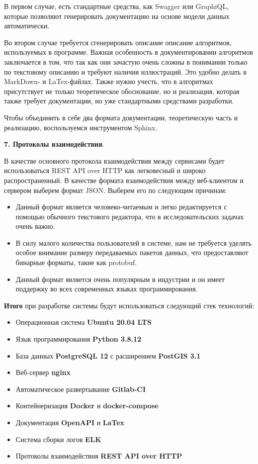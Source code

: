 В первом случае, есть стандартные средства, как Swagger или GraphiQL,
которые позволяют генерировать документацию на основе модели данных автоматически.

Во втором случае требуется сгенерировать описание описание алгоритмов, используемых в программе.
Важная особенность в документировании алгоритмов заключается в том, что так как они зачастую очень сложны
в понимании только по текстовому описанию и требуют наличия иллюстраций. Это удобно делать в MarkDown- и LaTex-файлах.
Также нужно учесть, что в алгоритмах присутствует не только теоретическое обоснование, но и реализация, которая также
требует документации, но уже стандартными средствами разработки.

Чтобы объединить в себе два формата документации, теоретическую часть и реализацию,
воспользуемся инструментом Sphinx\cite{Sphinx}.

\noindent \textbf{7. Протоколы взаимодействия}.

В качестве основного протокола взаимодействия между сервисами будет использоваться
REST API over HTTP как легковесный и широко распространенный.
В качестве формата взаимодействия между веб-клиентом и сервером выберем формат JSON. Выберем его по следующим причинам:
\begin{itemize}
    \item Данный формат является человеко-читаемым и легко редактируется с помощью обычного текстового редактора,
    что в исследовательских задачах очень важно.
    \item В силу малого количества пользователей в системе, нам не требуется уделять особое внимание размеру
    передаваемых пакетов данных, что предоставляют бинарные форматы, такие как protobuf\cite{Protobuf}.
    \item Данный формат является очень популярным в индустрии и он имеет поддержку
    во всех современных языках программирования.
\end{itemize}


\noindent \textbf{Итого} при разработке системы будут использоваться следующий стек технологий:
\begin{itemize}
    \item Операционная система \textbf{Ubuntu 20.04 LTS}
    \item Язык программирования \textbf{Python 3.8.12}
    \item База данных \textbf{PostgreSQL 12} с расширением \textbf{PostGIS 3.1}
    \item Веб-сервер \textbf{nginx}
    \item Автоматическое развертывание \textbf{Gitlab-CI}
    \item Контейнеризация \textbf{Docker} и \textbf{docker-compose}
    \item Документация \textbf{OpenAPI} и \textbf{LaTex}
    \item Система сборки логов \textbf{ELK}
    \item Протоколы взаимодействия \textbf{REST API over HTTP}
\end{itemize}